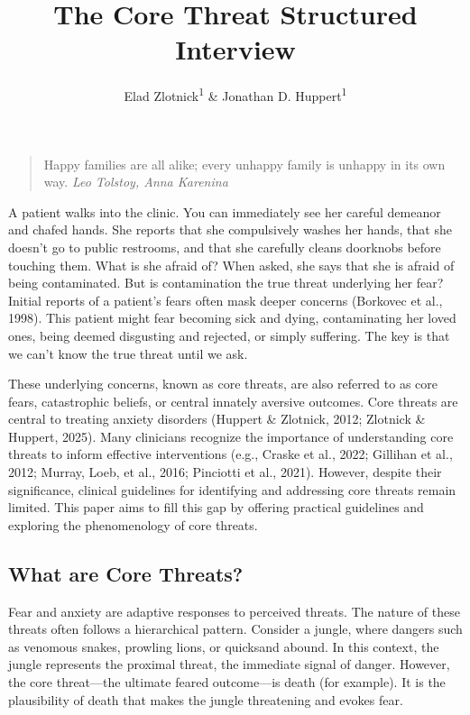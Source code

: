 \documentclass[
  man,floatsintext]{apa7}
\title{The Core Threat Structured Interview}
\author{Elad Zlotnick\textsuperscript{1} \& Jonathan D. Huppert\textsuperscript{1}}
\date{}
\affiliation{\vspace{0.5cm}\textsuperscript{1} The Hebrew University of Jerusalem}
\begin{document}
\maketitle

\begin{quote}
Happy families are all alike; every unhappy family is unhappy in its own way. \emph{Leo Tolstoy, Anna Karenina}
\end{quote}

A patient walks into the clinic.
You can immediately see her careful demeanor and chafed hands.
She reports that she compulsively washes her hands, that she doesn't go to public restrooms, and that she carefully cleans doorknobs before touching them.
What is she afraid of?
When asked, she says that she is afraid of being contaminated.
But is contamination the true threat underlying her fear?
Initial reports of a patient's fears often mask deeper concerns (Borkovec et al., 1998).
This patient might fear becoming sick and dying, contaminating her loved ones, being deemed disgusting and rejected, or simply suffering.
The key is that we can't know the true threat until we ask.

These underlying concerns, known as core threats, are also referred to as core fears, catastrophic beliefs, or central innately aversive outcomes.
Core threats are central to treating anxiety disorders (Huppert \& Zlotnick, 2012; Zlotnick \& Huppert, 2025).
Many clinicians recognize the importance of understanding core threats to inform effective interventions
(e.g., Craske et al., 2022; Gillihan et al., 2012; Murray, Loeb, et al., 2016; Pinciotti et al., 2021).
However, despite their significance, clinical guidelines for identifying and addressing core threats remain limited.
This paper aims to fill this gap by offering practical guidelines and exploring the phenomenology of core threats.

\subsection{What are Core Threats?}\label{what-are-core-threats}

Fear and anxiety are adaptive responses to perceived threats.
The nature of these threats often follows a hierarchical pattern.
Consider a jungle, where dangers such as venomous snakes, prowling lions, or quicksand abound.
In this context, the jungle represents the proximal threat, the immediate signal of danger.
However, the core threat---the ultimate feared outcome---is death (for example).
It is the plausibility of death that makes the jungle threatening and evokes fear.
\end{document}
